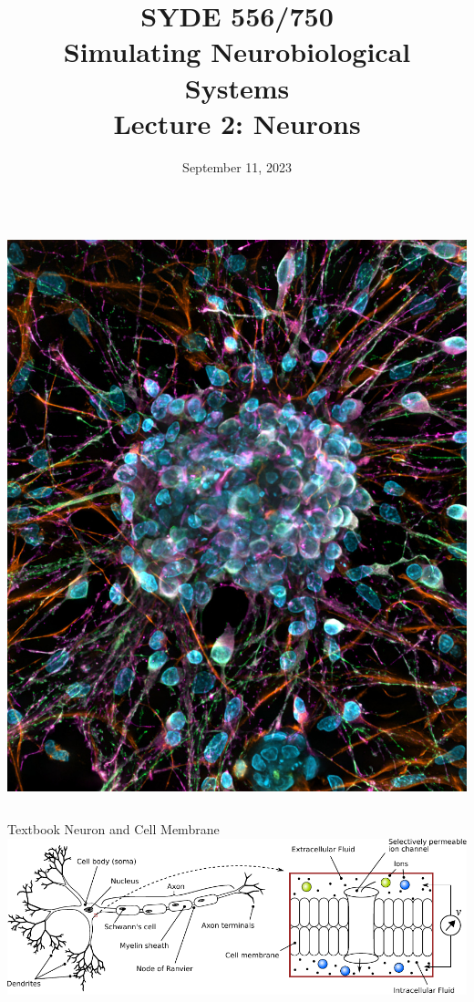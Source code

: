 \documentclass[handout,aspectratio=169]{beamer}
\date{September 11, 2023}
\title{SYDE 556/750 \\ Simulating Neurobiological Systems \\ Lecture 2: Neurons}
\begin{document}
	
\begin{frame}{}
	\vspace{0.5cm}
	\begin{columns}[c]
		\MakeTitle
		\includegraphics[width=\textwidth]{media/Rat_primary_cortical_neuron_culture_deconvolved_z-stack_overlay_(30614937102)_small.jpg}
	\end{columns}
\end{frame}

\begin{frame}{Textbook Neuron and Cell Membrane}
	\includegraphics[width=\textwidth]{media/neuron_sketch_membrane.pdf}
\end{frame}
\end{document}
